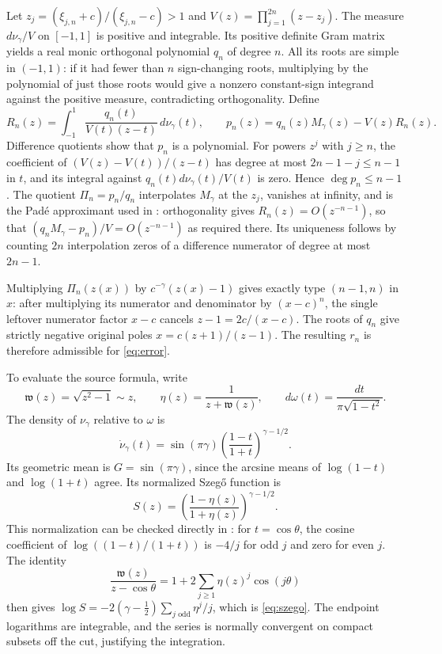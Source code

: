 \documentclass[11pt]{article}
\begin{document}
Let $z_j=(\xi_{j,n}+c)/(\xi_{j,n}-c)>1$ and
$V(z)=\prod_{j=1}^{2n}(z-z_j)$. The measure $d\nu_\gamma/V$ on $[-1,1]$
is positive and integrable. Its positive definite Gram matrix yields
a real monic orthogonal polynomial $q_n$ of degree $n$.
All its roots are simple in $(-1,1)$: if it had fewer than $n$
sign-changing roots, multiplying by the polynomial of just those roots
would give a nonzero constant-sign integrand against the positive
measure, contradicting orthogonality.
Define
\[
 R_n(z)=\int_{-1}^1\frac{q_n(t)}{V(t)(z-t)}\,d\nu_\gamma(t),\qquad
 p_n(z)=q_n(z)M_\gamma(z)-V(z)R_n(z).
\]
Difference quotients show that $p_n$ is a polynomial. For powers $z^j$
with $j\ge n$, the coefficient of $(V(z)-V(t))/(z-t)$ has degree at most
$2n-1-j\le n-1$ in $t$, and its integral against
$q_n(t)d\nu_\gamma(t)/V(t)$ is zero. Hence $\deg p_n\le n-1$.
The quotient $\Pi_n=p_n/q_n$ interpolates $M_\gamma$ at the $z_j$,
vanishes at infinity, and is the Pad\'e approximant used in \cite{BY}:
orthogonality gives $R_n(z)=O(z^{-n-1})$, so that
$(q_nM_\gamma-p_n)/V=O(z^{-n-1})$ as required there.
Its uniqueness follows by counting $2n$ interpolation zeros of a
difference numerator of degree at most $2n-1$.

Multiplying $\Pi_n(z(x))$ by $c^{-\gamma}(z(x)-1)$ gives exactly type
$(n-1,n)$ in $x$: after multiplying its numerator and denominator by
$(x-c)^n$, the single leftover numerator factor $x-c$ cancels
$z-1=2c/(x-c)$.
The roots of $q_n$ give strictly negative original poles
$x=c(z+1)/(z-1)$. The resulting $r_n$ is therefore admissible for
\eqref{eq:error}.

To evaluate the source formula, write
\[
 \mathfrak w(z)=\sqrt{z^2-1}\sim z,\qquad
 \eta(z)=\frac1{z+\mathfrak w(z)},\qquad
 d\omega(t)=\frac{dt}{\pi\sqrt{1-t^2}}.
\]
The density of $\nu_\gamma$ relative to $\omega$ is
\[
 \dot\nu_\gamma(t)=\sin(\pi\gamma)
              \left(\frac{1-t}{1+t}\right)^{\gamma-1/2}.
\]
Its geometric mean is $G=\sin(\pi\gamma)$, since the arcsine means of
$\log(1-t)$ and $\log(1+t)$ agree. Its normalized Szeg\H{o} function is
\begin{equation}\label{eq:szego}
 S(z)=\left(\frac{1-\eta(z)}{1+\eta(z)}\right)^{\gamma-1/2}.
\end{equation}
This normalization can be checked directly in \cite[equation~(2.11)]{BY}:
for $t=\cos\theta$, the cosine coefficient of
$\log((1-t)/(1+t))$ is $-4/j$ for odd $j$ and zero for even $j$.
The identity
\[
 \frac{\mathfrak w(z)}{z-\cos\theta}
       =1+2\sum_{j\ge1}\eta(z)^j\cos(j\theta)
\]
then gives $\log S=-2(\gamma-\tfrac12)
\sum_{j\text{ odd}}\eta^j/j$, which is \eqref{eq:szego}.
The endpoint logarithms are integrable, and the series is normally
convergent on compact subsets off the cut, justifying the integration.
\end{document}

